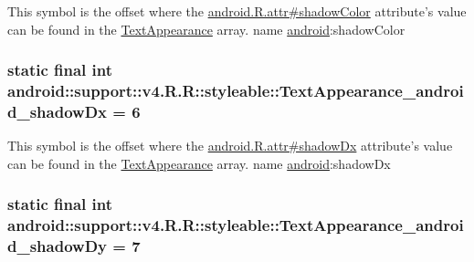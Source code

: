 This symbol is the offset where the \hyperlink{}{android.R.attr\#shadowColor} attribute's value can be found in the \hyperlink{classandroid_1_1support_1_1v4_1_1_r_1_1styleable_958f0ff7225bca693e30641e14dd4569}{TextAppearance} array.  name \hyperlink{namespaceandroid}{android}:shadowColor \hypertarget{classandroid_1_1support_1_1v4_1_1_r_1_1styleable_caca2f26badd9c92b5b0111fb4411167}{
\subsubsection[{TextAppearance\_\-android\_\-shadowDx}]{\setlength{\rightskip}{0pt plus 5cm}static final int android::support::v4.R.R::styleable::TextAppearance\_\-android\_\-shadowDx = 6}}
\label{classandroid_1_1support_1_1v4_1_1_r_1_1styleable_caca2f26badd9c92b5b0111fb4411167}


This symbol is the offset where the \hyperlink{}{android.R.attr\#shadowDx} attribute's value can be found in the \hyperlink{classandroid_1_1support_1_1v4_1_1_r_1_1styleable_958f0ff7225bca693e30641e14dd4569}{TextAppearance} array.  name \hyperlink{namespaceandroid}{android}:shadowDx \hypertarget{classandroid_1_1support_1_1v4_1_1_r_1_1styleable_df8c466194468431db1ca727606ba7db}{
\subsubsection[{TextAppearance\_\-android\_\-shadowDy}]{\setlength{\rightskip}{0pt plus 5cm}static final int android::support::v4.R.R::styleable::TextAppearance\_\-android\_\-shadowDy = 7}}
\label{classandroid_1_1support_1_1v4_1_1_r_1_1styleable_df8c466194468431db1ca727606ba7db}


